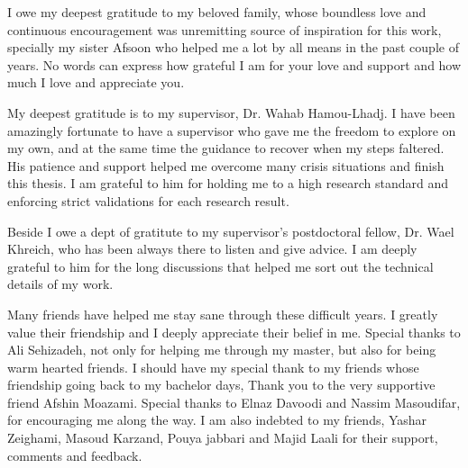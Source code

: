 I owe my deepest gratitude to my beloved family, whose
boundless love and continuous encouragement was unremitting source of inspiration
for this work, specially my sister Afsoon who helped me a lot by all means in the past couple of years.  No words can express how grateful I am for your love and support and
how much I love and appreciate you.

My deepest gratitude is to my supervisor, Dr. Wahab Hamou-Lhadj. I have been amazingly fortunate to have a supervisor who gave me the freedom to explore on my own, and at the same time the guidance to recover when my steps faltered. His patience and support helped me overcome many crisis situations and finish this thesis. I am grateful to him for holding me to a high research standard and enforcing strict validations for each research result.

Beside I owe a dept of gratitute to my supervisor's postdoctoral fellow, Dr. Wael Khreich, who has been always there to listen and give advice. I am deeply grateful to him for the long discussions that helped me sort out the technical details of my work. 

Many friends have helped me stay sane through these difficult years. I greatly value their friendship and I deeply appreciate their belief in me. Special thanks to Ali Sehizadeh, not only for helping me through my master, but also for being warm hearted friends. I should have my special thank to my friends whose friendship going back to my bachelor days, Thank you to the very supportive friend Afshin Moazami.
Special thanks to Elnaz Davoodi and Nassim Masoudifar, for encouraging me along the way.
I am also indebted to my friends, Yashar Zeighami, Masoud Karzand, Pouya jabbari and Majid Laali for their support, comments and feedback.

